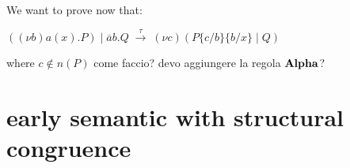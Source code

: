\begin{example}
    We want to prove now that:
    \begin{center}
      $((\nu b) a(x).P)\; |\; \overline{a}b.Q\; \xrightarrow{\tau}\; (\nu c) (P\{c/b\}\{b/x\}\; |\; Q)$
    \end{center}
    where $c\notin n(P)$
  come faccio? devo aggiungere la regola $\bf{Alpha}$?
\end{example}


%   



\section{early semantic with structural congruence}

